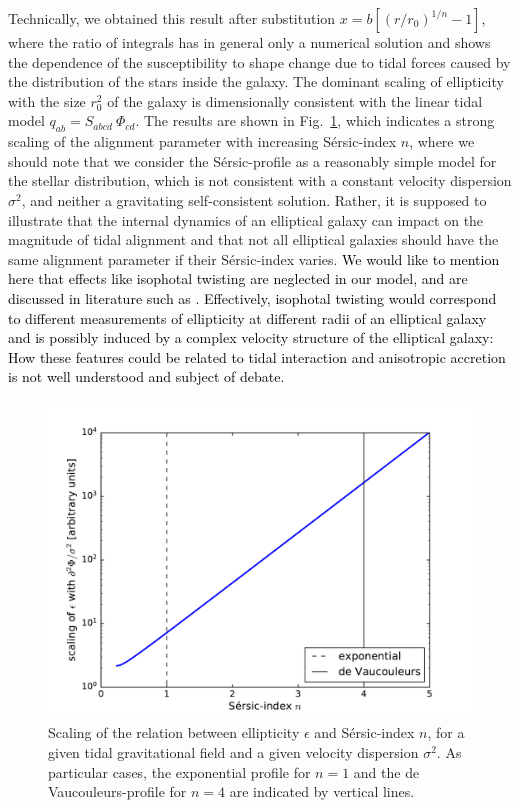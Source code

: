 \documentclass[a4paper,fleqn,usenatbib]{mnras}
\newcommand\spirou[1]{\textcolor{black}{#1}}
\begin{document}
Technically, we obtained this result after substitution $x = b\left[(r/r_0)^{1/n}-1\right]$, where the ratio of integrals has in general only a numerical solution and shows the dependence of the susceptibility to shape change due to tidal forces caused by the distribution of the stars inside the galaxy. The dominant scaling of ellipticity with the size $r_0^2$ of the galaxy is dimensionally consistent with the linear tidal model $q_{ab} = S_{abcd}\:\Phi_{cd}$. The results are shown in Fig.~\ref{fig_sersic_scaling}, which indicates a strong scaling of the alignment parameter with increasing S{\'e}rsic-index $n$, where we should note that we consider the S{\'e}rsic-profile as a reasonably simple model for the stellar distribution, which is not consistent with a constant velocity dispersion $\sigma^2$, and neither a gravitating self-consistent solution. Rather, it is supposed to illustrate that the internal dynamics of an elliptical galaxy can impact on the magnitude of tidal alignment and that not all elliptical galaxies should have the same alignment parameter if their S{\'e}rsic-index varies. \spirou{We would like to mention here that effects like isophotal twisting are neglected in our model, and are discussed in literature such as \cite{Singh:2014kla}. Effectively, isophotal twisting would correspond to different measurements of ellipticity at different radii of an elliptical galaxy and is possibly induced by a complex velocity structure of the elliptical galaxy: How these features could be related to tidal interaction and anisotropic accretion is not well understood and subject of debate.}

\begin{figure}
\centering
\includegraphics[scale=0.45]{./figures/sersic_scaling.pdf}
\caption{Scaling of the relation between ellipticity $\epsilon$ and S{\'e}rsic-index $n$, for a given tidal gravitational field and a given velocity dispersion $\sigma^2$. As particular cases, the exponential profile for $n=1$ and the de Vaucouleurs-profile for $n=4$ are indicated by vertical lines.}
\label{fig_sersic_scaling}
\end{figure}
\end{document}
